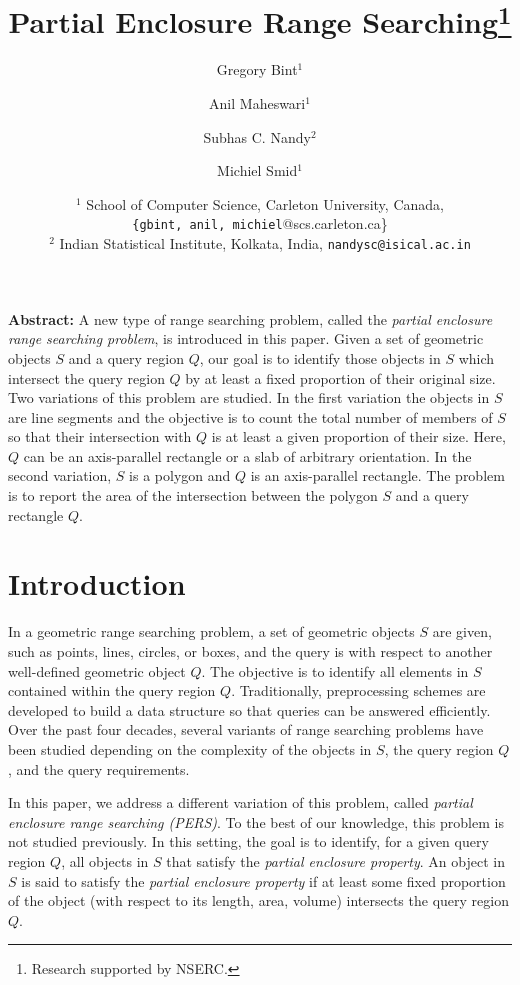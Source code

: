 \documentclass[a4paper,11pt]{article}
\title{Partial Enclosure Range Searching\thanks{Research supported by NSERC.}}
\author{Gregory Bint$^1$ \and Anil Maheswari$^1$ \and
        Subhas C. Nandy$^2$ 
        \and Michiel Smid$^1$ }
\date{$^1$ School of Computer Science, Carleton University, Canada, \\{\tt \{gbint,
anil, michiel}@scs.carleton.ca\}\\
$^2$ Indian Statistical Institute, Kolkata, India,
{\tt  nandysc@isical.ac.in}}
\newcommand{\PERS}[0]{PERS}
\begin{document}
\maketitle

{\bf Abstract:}
A new type of range searching problem, called the \emph{partial 
enclosure range searching problem}, is introduced in this paper. 
Given a set of geometric objects $S$ and a query region $Q$, our 
goal is to identify those objects in $S$ which intersect the 
query region $Q$ by at least a fixed proportion of their original 
size. Two variations of this problem are studied. In the first 
variation the objects in $S$ are line segments and the objective 
is to count the total number of members of $S$ so that their 
intersection with $Q$ is at least a given proportion of their size. 
Here, $Q$ can be an axis-parallel rectangle or a slab of arbitrary 
orientation. In the second variation, $S$ is a polygon and $Q$ is 
an axis-parallel rectangle. 
The problem is to report the area of the intersection between the 
polygon $S$ and a query rectangle $Q$. 


\section{Introduction}
In a geometric range searching problem, a set of geometric objects 
$S$ are given, such as points, lines, circles, 
or boxes, and the query is with respect to another well-defined 
geometric object $Q$. The objective is to identify all 
elements in $S$ contained within the query region $Q$. 
Traditionally, preprocessing schemes are developed to build a data 
structure so that queries can be answered efficiently. Over the past four decades, 
several variants of range searching problems have been studied depending 
on the complexity of the objects in $S$, the 
query region $Q$, and the query requirements. 

In this paper, we address a different variation of this problem, 
called \emph{partial enclosure range searching (\PERS{})}. To the 
best of our knowledge, this problem is not studied previously. In 
this setting, the goal is to identify, for a given query region 
$Q$, all objects in $S$ that satisfy the \emph{partial enclosure 
property}. An object in $S$ is said to satisfy the \emph{partial 
enclosure property} if at least some fixed proportion of the object
(with respect to its length, area, volume) intersects the query 
region $Q$. 
\end{document}
